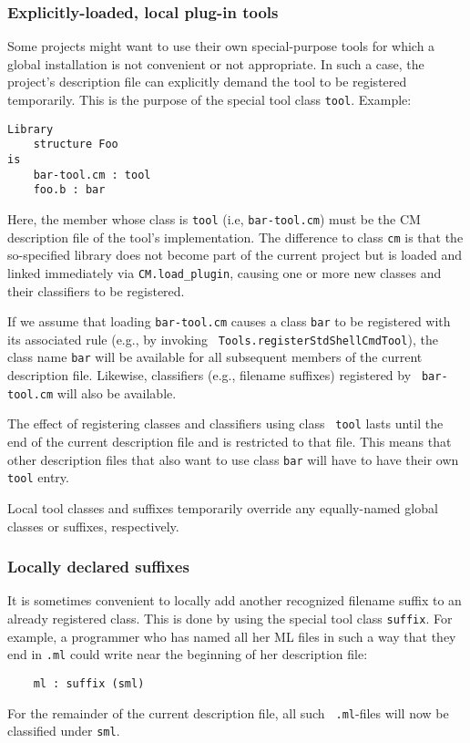 \subsubsection{Explicitly-loaded, local plug-in tools}
\label{sec:localtools}

Some projects might want to use their own special-purpose tools for
which a global installation is not convenient or not appropriate.  In
such a case, the project's description file can explicitly demand the
tool to be registered temporarily.  This is the purpose of the special
tool class {\tt tool}.  Example:

\begin{verbatim}
Library
    structure Foo
is
    bar-tool.cm : tool
    foo.b : bar
\end{verbatim}

Here, the member whose class is {\tt tool} (i.e, {\tt bar-tool.cm})
must be the CM description file of the tool's implementation.  The
difference to class {\tt cm} is that the so-specified library does not
become part of the current project but is loaded and linked
immediately via {\tt CM.load\_plugin}, causing one or more new classes
and their classifiers to be registered.

If we assume that loading {\tt bar-tool.cm} causes a class {\tt bar}
to be registered with its associated rule (e.g., by invoking {\tt
Tools.registerStdShellCmdTool}), the class name {\tt bar} will be
available for all subsequent members of the current description file.
Likewise, classifiers (e.g., filename suffixes) registered by {\tt
bar-tool.cm} will also be available.

The effect of registering classes and classifiers using class {\tt
tool} lasts until the end of the current description file and is
restricted to that file.  This means that other description files that
also want to use class {\tt bar} will have to have their own {\tt
tool} entry.

Local tool classes and suffixes temporarily override any equally-named
global classes or suffixes, respectively.

\subsubsection{Locally declared suffixes}
\label{sec:localsuffixes}

It is sometimes convenient to locally add another recognized filename
suffix to an already registered class.  This is done by using the
special tool class {\tt suffix}.  For example, a programmer who has
named all her ML files in such a way that they end in {\tt .ml}
could write near the beginning of her description file:

\begin{verbatim}
    ml : suffix (sml)
\end{verbatim}

For the remainder of the current description file, all such {\tt
.ml}-files will now be classified under {\tt sml}.
